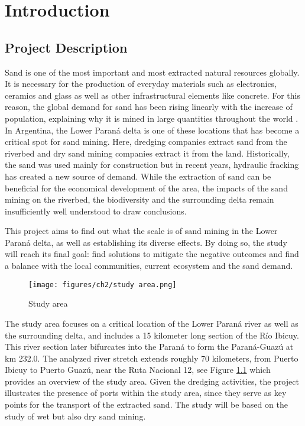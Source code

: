 \chapter{Introduction}
\label{chapter:introduction}

\section{Project Description}

Sand is one of the most important and most extracted natural resources globally. It is necessary for the production of everyday materials such as electronics, ceramics and glass as well as other infrastructural elements like concrete. For this reason, the global demand for sand has been rising linearly with the increase of population, explaining why it is mined in large quantities throughout the world \autocite{wwfRisingDemandSand}. 
In Argentina, the Lower Paraná delta is one of these locations that has become a critical spot for sand mining. Here, dredging companies extract  sand from the riverbed and dry sand mining companies extract it from the land. Historically, the sand was used mainly for construction but in recent years, hydraulic fracking has created a new source of demand.
While the extraction of sand can be beneficial for the economical development of the area, the impacts of the sand mining on the riverbed, the biodiversity and the surrounding delta remain insufficiently well understood to draw conclusions. 

This project aims to find out what the scale is of sand mining in the Lower Paraná delta, as well as establishing its diverse effects. By doing so, the study will reach its final goal: find solutions to mitigate the negative outcomes and find a balance with the local communities, current ecosystem and the sand demand. 

\begin{figure}[H]
    \centering    \texttt{[image: figures/ch2/study area.png]}
    \caption{Study area}
    \label{fig:study area}
\end{figure}

The study area focuses on a critical location of the Lower Paraná river as well as the surrounding delta, and includes a 15 kilometer long section of the Río Ibicuy. This river section later bifurcates into the Paraná to form the Paraná-Guazú at km 232.0. The analyzed river stretch extends roughly 70 kilometers, from Puerto Ibicuy to Puerto Guazú, near the Ruta Nacional 12, see Figure \ref{fig:study area} which provides an overview of the study area. Given the dredging activities, the project illustrates the presence of ports within the study area, since they serve as key points for the transport of the extracted sand. The study will be based on the study of wet but also dry sand mining.

